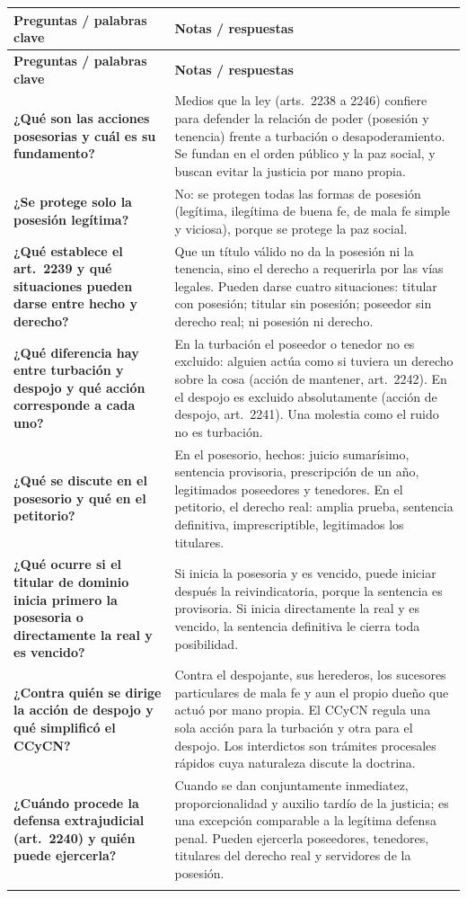 \documentclass[12pt,oneside]{book}
\makeatletter
\renewcommand{\arraystretch}{1.25}
\newcommand{\cq}[2]{\textbf{#1} & #2 \\[0.45em]}
\newcommand{\cornell}[3]{%
\par\bigskip\noindent{\large\bfseries Cuadro Cornell: #1}\par\nopagebreak\smallskip
\begingroup
\small
\renewcommand{\arraystretch}{1.15}
\begin{longtable}{@{}>{\raggedright\arraybackslash}p{0.26\textwidth}>{\raggedright\arraybackslash}p{0.66\textwidth}@{}}
\toprule
\textbf{Preguntas / palabras clave} & \textbf{Notas / respuestas} \\
\midrule
\endfirsthead
\toprule
\textbf{Preguntas / palabras clave} & \textbf{Notas / respuestas} \\
\midrule
\endhead
#2
\midrule
\multicolumn{2}{@{}p{\dimexpr0.92\textwidth+2\tabcolsep\relax}@{}}{\vspace{0.2em}\textbf{Resumen.} #3\vspace{0.2em}} \\
\bottomrule
\end{longtable}
\endgroup
}
\makeatother
\begin{document}
\cornell{acciones posesorias}{
\cq{¿Qué son las acciones posesorias y cuál es su fundamento?}{Medios que la ley (arts.~2238 a 2246) confiere para defender la relación de poder (posesión y tenencia) frente a turbación o desapoderamiento. Se fundan en el orden público y la paz social, y buscan evitar la justicia por mano propia.}
\cq{¿Se protege solo la posesión legítima?}{No: se protegen todas las formas de posesión (legítima, ilegítima de buena fe, de mala fe simple y viciosa), porque se protege la paz social.}
\cq{¿Qué establece el art.~2239 y qué situaciones pueden darse entre hecho y derecho?}{Que un título válido no da la posesión ni la tenencia, sino el derecho a requerirla por las vías legales. Pueden darse cuatro situaciones: titular con posesión; titular sin posesión; poseedor sin derecho real; ni posesión ni derecho.}
\cq{¿Qué diferencia hay entre turbación y despojo y qué acción corresponde a cada uno?}{En la turbación el poseedor o tenedor no es excluido: alguien actúa como si tuviera un derecho sobre la cosa (acción de mantener, art.~2242). En el despojo es excluido absolutamente (acción de despojo, art.~2241). Una molestia como el ruido no es turbación.}
\cq{¿Qué se discute en el posesorio y qué en el petitorio?}{En el posesorio, hechos: juicio sumarísimo, sentencia provisoria, prescripción de un año, legitimados poseedores y tenedores. En el petitorio, el derecho real: amplia prueba, sentencia definitiva, imprescriptible, legitimados los titulares.}
\cq{¿Qué ocurre si el titular de dominio inicia primero la posesoria o directamente la real y es vencido?}{Si inicia la posesoria y es vencido, puede iniciar después la reivindicatoria, porque la sentencia es provisoria. Si inicia directamente la real y es vencido, la sentencia definitiva le cierra toda posibilidad.}
\cq{¿Contra quién se dirige la acción de despojo y qué simplificó el CCyCN?}{Contra el despojante, sus herederos, los sucesores particulares de mala fe y aun el propio dueño que actuó por mano propia. El CCyCN regula una sola acción para la turbación y otra para el despojo. Los interdictos son trámites procesales rápidos cuya naturaleza discute la doctrina.}
\cq{¿Cuándo procede la defensa extrajudicial (art.~2240) y quién puede ejercerla?}{Cuando se dan conjuntamente inmediatez, proporcionalidad y auxilio tardío de la justicia; es una excepción comparable a la legítima defensa penal. Pueden ejercerla poseedores, tenedores, titulares del derecho real y servidores de la posesión.}
}{Las acciones posesorias son la primera y más veloz línea de defensa de quien, sea o no titular de un derecho real, ve perturbada o extinguida su relación de poder con una cosa. Se justifican en la paz social y en la erradicación de la justicia por mano propia; se tramitan por juicio sumarísimo, su prueba se limita al hecho posesorio y la sentencia es provisoria. La acción de mantener responde a la turbación y la de despojo al desapoderamiento; la defensa privada es una excepción de requisitos estrictos. El derecho real mismo se defiende con las acciones reales.}
\end{document}
